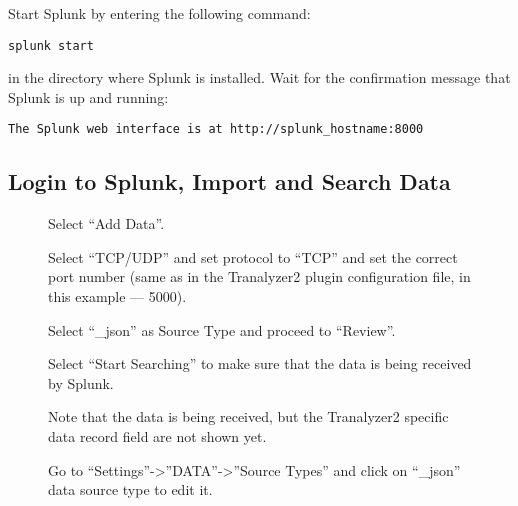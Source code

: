 \documentclass[documentation]{subfiles}
\begin{document}
Start Splunk by entering the following command:
\begin{verbatim}
splunk start
\end{verbatim}
in the directory where Splunk is installed. Wait for the confirmation
message that Splunk is up and running:
\begin{verbatim}
The Splunk web interface is at http://splunk_hostname:8000
\end{verbatim}

\subsection{Login to Splunk, Import and Search Data }

\begin{figure}[!ht]
    \centering
    \caption{Select ``Add Data''.}
\end{figure}

\begin{figure}[!ht]
    \centering
    \caption{Select ``TCP/UDP'' and set protocol to ``TCP'' and set the correct
             port number (same as in the Tranalyzer2 plugin configuration file,
             in this example --- 5000).}
\end{figure}

\begin{figure}[!ht]
    \centering
    \caption{Select ``\_json'' as Source Type and proceed to ``Review''.}
\end{figure}

\begin{figure}[!ht]
    \centering
    \caption{Select ``Start Searching'' to make sure that the data is being received by Splunk.}
\end{figure}

\begin{figure}[!ht]
    \centering
    \caption{Note that the data is being received, but the Tranalyzer2 specific
        data record field are not shown yet.}
\end{figure}

\begin{figure}[!ht]
    \centering
    \caption{Go to ``Settings''->''DATA''->''Source Types'' and click on
        ``\_json'' data source type to edit it.}
\end{figure}
\end{document}
